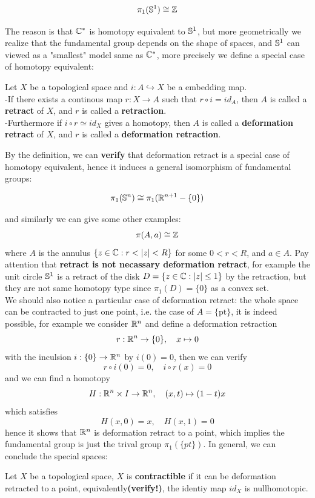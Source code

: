 \documentclass[12pt,a4paper]{article}
\begin{document}
\begin{claim}
    \[\pi_1(\mathbb{S}^1) \cong \mathbb{Z}\]
\end{claim}
The reason is that \(\mathbb{C}^*\) is homotopy equivalent to \(\mathbb{S}^1\), but more geometrically we realize that the fundamental group depends on the shape of spaces, and \(\mathbb{S}^{1}\) can viewed as a "smallest" model same as \(\mathbb{C}^*\), more precisely we define a special case of homotopy equivalent:
\begin{definitionplain}
    Let \(X\) be a topological space and \(i:A \hookrightarrow X\) be a embedding map.\\
    
    -If there exists a continous map \(r:X \to A\) such that \(r \circ i = id_A\), then \(A\) is called a \textbf{retract} of \(X\), and \(r\) is called a \textbf{retraction}.\\

    -Furthermore if \(i \circ r \simeq id_X\) gives a homotopy, then \(A\) is called a \textbf{deformation retract} of \(X\), and \(r\) is called a \textbf{deformation retraction}.
\end{definitionplain}
 By the definition, we can \textbf{verify} that deformation retract is a special case of homotopy equivalent, hence it induces a general isomorphism of fundamental groups:
 \begin{claim}
    \[\pi_1(\mathbb{S}^n) \cong \pi_1(\mathbb{R}^{n+1}-\{0\}) \]
 \end{claim}
 and similarly we can give some other examples:
 \[\pi(A,a) \cong \mathbb{Z}\]
 where \(A\) is the annulus \(\{z \in \cc: r<|z|<R\}\) for some \(0<r<R\), and \(a \in A\). Pay attention that \textbf{retract is not necassary deformation retract}, for example the unit circle \(\mathbb{S}^1\) is a retract of the disk \(D = \{z \in \mathbb{C}: |z| \leq 1\}\) by the retraction, but they are not same homotopy type since \(\pi_1(D) = \{0\}\) as a convex set.\\

 We should also notice a particular case of deformation retract: the whole space can be contracted to just one point, i.e. the case of \(A = \{\text{pt}\}\), it is indeed possible, for example we consider \(\mathbb{R}^n\) and define a deformation retraction
 \[r:\mathbb{R}^n \to \{0\}, \quad x \mapsto 0\]
 with the inculsion \(i:\{0\} \to \mathbb{R}^n\) by \(i(0) = 0\), then we can verify
 \[r \circ i(0) = 0, \quad i \circ r(x) = 0\]
 and we can find a homotopy 
\[H:\mathbb{R}^n \times I \to \mathbb{R}^n, \quad (x,t) \mapsto (1-t)x\]
which satisfies
\[H(x,0) = x, \quad H(x,1) = 0\]
hence it shows that \(\mathbb{R}^n\) is deformation retract to a point, which implies the fundamental group is just the trival group \(\pi_1(\{pt\})\). In general, we can conclude the special spaces:
\begin{definitionplain}
    Let \(X\) be a topological space, \(X\) is \textbf{contractible} if it can be deformation retracted to a point, equivalently\textbf{(verify!)}, the identiy map \(id_X\) is nullhomotopic.
\end{definitionplain}
\end{document}
